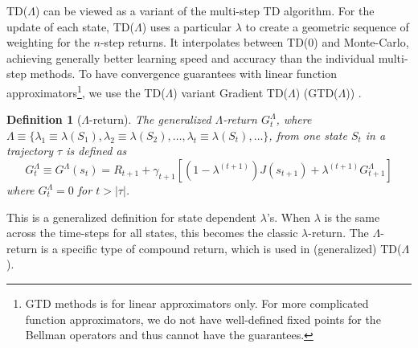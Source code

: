 \documentclass{article}
\newcommand\ie{\textit{i.e.}}
\newtheorem{definition}{Definition}[section]
\newtheorem{proposition}{Proposition}[section]
\begin{document}
TD($\Lambda$) can be viewed as a variant of the multi-step TD algorithm. For the update of each state, TD($\Lambda$) uses a particular $\lambda$ to create a geometric sequence of weighting for the $n$-step returns. It interpolates between TD($0$) and Monte-Carlo, achieving generally better learning speed and accuracy than the individual multi-step methods. To have convergence guarantees with linear function approximators\footnote{GTD methods is for linear approximators only. For more complicated function approximators, we do not have well-defined fixed points for the Bellman operators and thus cannot have the guarantees.}, we use the TD($\Lambda$) variant Gradient TD($\Lambda$) (GTD($\Lambda$)) \cite{sutton2009convergent, sutton2009fast}.
\begin{definition}[$\Lambda$-return]
The generalized $\Lambda$-return $G_t^\Lambda$, where $\Lambda \equiv \{\lambda_1 \equiv \lambda(S_1), \lambda_2 \equiv \lambda(S_2), \dots, \lambda_t \equiv \lambda(S_t), \dots\}$, from one state $S_t$ in a trajectory $\tau$ is defined as
\begin{equation}
G_t^\Lambda \equiv G^\Lambda(s_t) = R_{t+1} + \gamma_{t+1} [(1 - \lambda^{(t+1)})J(s_{t+1}) + \lambda^{(t+1)}G_{t+1}^\Lambda]
\end{equation}
where $G_t^\Lambda = 0$ for $t > |\tau|$.
\end{definition}
This is a generalized definition for state dependent $\lambda$'s. When $\lambda$ is the same across the time-steps for all states, this becomes the classic $\lambda$-return. The $\Lambda$-return is a specific type of compound return, which is used in (generalized) TD($\Lambda$).
\par
\end{document}
